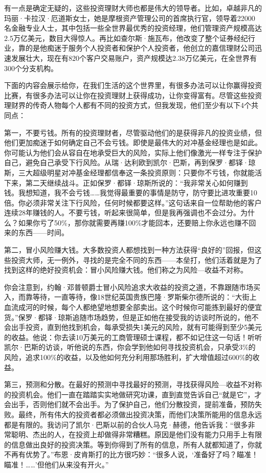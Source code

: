 有一点是确定无疑的，这些投资理财大师也都是伟大的领导者。比如，卓越非凡的玛丽·卡拉汉·厄道斯女士，她是摩根资产管理公司的首席执行官，领导着22000名金融专业人士，其中包括一些全世界最优秀的投资经理，他们管理资产规模高达2.5万亿美元，数目大得惊人。再比如查尔斯·施瓦布，他改变了整个证券经纪行业，靠的是他痴迷于服务个人投资者和保护个人投资者，他创立的嘉信理财公司迅速发展壮大，现在有820个客户交易账户，资产规模达2.38万亿美元，在全世界有300个分支机构。

下面的内容会展示给你，在我们生活的这个世界里，有很多办法可以让你赢得投资比赛，有很多办法可以让你在投资理财上获得成功，让你变得富有。尽管这些投资理财界的传奇人物每个人都有不同的投资方式，但我发现，他们至少有以下4个共同点：

第一，不要亏钱。所有的投资理财者，尽管驱动他们的是获得非凡的投资业绩，但他们更加痴迷于如何确定自己不会亏钱。即使是最伟大的对冲基金经理也是如此。你可能认为他们会从容自在地承受巨大的风险，实际上他们像激光一样专注于保护自己，避免自己承受下行风险。从瑞·达利欧到凯尔·巴斯，再到保罗·都铎·琼斯，三大超级明星对冲基金经理都信奉这一条投资原则：只要你不亏钱，你就能活下来，第二天继续战斗。正如保罗·都铎·琼斯所说的：“我非常关心如何赚到钱。我想知道，我不会亏钱……我觉得最重要的事情是防守，防守要比进攻重要10倍。你必须非常关注下行风险，任何时候都要这样。”这句话来自一位帮助他的客户连续28年赚钱的人。不要亏钱，听起来很简单，但是我再强调也不会过分。为什么？如果你亏了50\%，那你就需要再赚100\%才能回本，还要赔上你永远也赚不回来的东西——时间。

第二，冒小风险赚大钱。大多数投资人都想找到一种方法获得“良好的”回报，但这些投资大师，无一例外，寻找的是完全不同的东西——本垒打，他们活着就是为了找到这样的绝好投资机会：冒小风险赚大钱。他们称之为风险—收益不对称。

你会注意到，约翰·邓普顿爵士冒小风险追求大收益的投资之道，不靠跟随市场买入，而靠等待，一直等待，像18世纪英国贵族巴隆·罗斯柴尔德所说的：“大街上血流成河的时候，每个人都绝望地想要全部卖出。这个时候你可能拣到最好的便宜货。”保罗·都铎·琼斯追随市场趋势，但是正如他在接受我的访谈时所说的，他不会出手投资，直到他找到机会，每承受损失1美元的风险，就有可能得到至少5美元的收益。他说：你去读10万美元的工商管理硕士课程，都不如记住这一句话！听听凯尔·巴斯的访谈，听他说的东西，你会学到他如何寻找投资机会，只承受3\%的风险，追求100\%的收益，以及他如何充分利用那场胜利，扩大增值超过600\%的收益。

第三，预测和分散。在最好的预测中寻找最好的预测，寻找获得风险—收益不对称的投资机会。他们一直在踏踏实实地做研究功课，直到直觉告诉自己“就是它”，才会出手，否则他们就不会出手。为了保护自己，他们分散投资，提前准备，预防失败。最终，所有伟大的投资者都必须做出投资决策，而他们决策所能用的信息永远都是有限的。我访问了凯尔·巴斯以前的合伙人马克·赫德，他告诉我：“很多非常聪明、杰出的人，在投资上却做得非常糟糕。原因是他们没有能力只用手上有限的信息做出良好的投资决策。等到你得到了所有的信息，所有人就都知道了，你就不再有优势了。”布恩·皮肯斯打的比方很巧妙：“很多人说，‘准备好了吗？瞄准！瞄准！……’但他们从来没有开火。”

